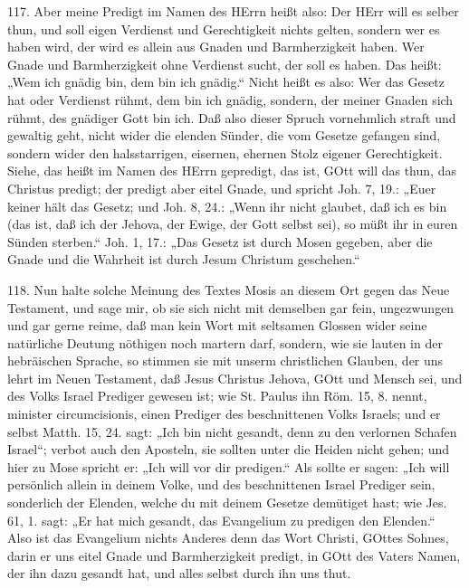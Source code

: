 117. Aber meine Predigt im Namen des HErrn heißt also: Der HErr will es selber thun, und soll eigen Verdienst und Gerechtigkeit nichts gelten, sondern wer es haben wird, der wird es allein aus Gnaden und Barmherzigkeit haben. Wer Gnade und Barmherzigkeit ohne Verdienst sucht, der soll es haben. Das heißt: „Wem ich gnädig bin, dem bin ich gnädig.“ Nicht heißt es also: Wer das Gesetz hat oder Verdienst rühmt, dem bin ich gnädig, sondern, der meiner Gnaden sich rühmt, des gnädiger Gott bin ich. Daß also dieser Spruch vornehmlich straft und gewaltig geht, nicht wider die elenden Sünder, die vom Gesetze gefangen sind, sondern wider den halsstarrigen, eisernen, ehernen Stolz eigener Gerechtigkeit. Siehe, das heißt im Namen des HErrn gepredigt, das ist, GOtt will das thun, das Christus predigt; der predigt aber eitel Gnade, und spricht Joh. 7, 19.: „Euer keiner hält das Gesetz; und Joh. 8, 24.: „Wenn ihr nicht glaubet, daß ich es bin (das ist, daß ich der Jehova, der Ewige, der Gott selbst sei), so müßt ihr in euren Sünden sterben.“ Joh. 1, 17.: „Das Gesetz ist durch Mosen gegeben, aber die Gnade und die Wahrheit ist durch Jesum Christum geschehen.“

118. Nun halte solche Meinung des Textes Mosis an diesem Ort gegen das Neue Testament, und sage mir, ob sie sich nicht mit demselben gar fein, ungezwungen und gar gerne reime, daß man kein Wort mit seltsamen Glossen wider seine natürliche Deutung nöthigen noch martern darf, sondern, wie sie lauten in der hebräischen Sprache, so stimmen sie mit unserm christlichen Glauben, der uns lehrt im Neuen Testament, daß Jesus Christus Jehova, GOtt und Mensch sei, und des Volks Israel Prediger gewesen ist; wie St. Paulus ihn Röm. 15, 8. nennt, minister circumcisionis, einen Prediger des beschnittenen Volks Israels; und er selbst Matth. 15, 24. sagt: „Ich bin nicht gesandt, denn zu den verlornen Schafen Israel“; verbot auch den Aposteln, sie sollten unter die Heiden nicht gehen;
und hier zu Mose spricht er: „Ich will vor dir predigen.“ Als sollte er sagen: „Ich will persönlich allein in deinem Volke, und des beschnittenen Israel Prediger sein, sonderlich der Elenden, welche du mit deinem Gesetze demütiget hast; wie Jes. 61, 1. sagt: „Er hat mich gesandt, das Evangelium zu predigen den Elenden.“ Also ist das Evangelium nichts Anderes denn das Wort Christi, GOttes Sohnes, darin er uns eitel Gnade und Barmherzigkeit predigt, in GOtt des Vaters Namen, der ihn dazu gesandt hat, und alles selbst durch ihn uns thut.

